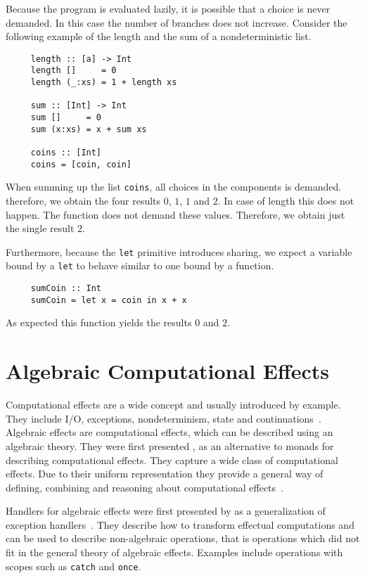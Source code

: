 
Because the program is evaluated lazily, it is possible that a choice is never demanded.
In this case the number of branches does not increase.
Consider the following example of the length and the sum of a nondeterministic list.
\begin{verbatim}
     length :: [a] -> Int
     length []     = 0
     length (_:xs) = 1 + length xs

     sum :: [Int] -> Int
     sum []     = 0
     sum (x:xs) = x + sum xs

     coins :: [Int]
     coins = [coin, coin]
\end{verbatim}
When summing up the list \texttt{coins}, all choices in the components is
demanded.
therefore, we obtain the four results $0$, $1$, $1$ and $2$.
In case of length this does not happen.
The function does not demand these values.
Therefore, we obtain just the single result $2$.

Furthermore, because the \texttt{let} primitive introduces sharing, we expect a
variable bound by a \texttt{let} to behave similar to one bound by a function.

\begin{verbatim}
     sumCoin :: Int
     sumCoin = let x = coin in x + x
\end{verbatim}
As expected this function yields the results $0$ and $2$.


\section{Algebraic Computational Effects}

Computational effects are a wide concept and usually introduced by example.
They include I/O, exceptions, nondeterminism, state and
continuations~\cite{DBLP:conf/fossacs/PlotkinP02,DBLP:journals/corr/abs-1807-05923}.
Algebraic effects are computational effects, which can be described using an
algebraic theory.
They were first presented \textcite{DBLP:conf/fossacs/PlotkinP02}, as an
alternative to monads for describing computational effects.
They capture a wide class of computational effects.
Due to their uniform representation they provide a general way of defining,
combining and reasoning about computational
effects~\cite{DBLP:journals/corr/PlotkinP13}.

Handlers for algebraic effects were first presented by
\citeauthor{DBLP:conf/esop/PlotkinP09} as a generalization of exception
handlers~\cite{DBLP:conf/esop/PlotkinP09}.
They describe how to transform effectual computations and can be used to
describe non-algebraic operations, that is operations which did not fit in the
general theory of algebraic effects.
Examples include operations with scopes such as \texttt{catch} and
\texttt{once}.

